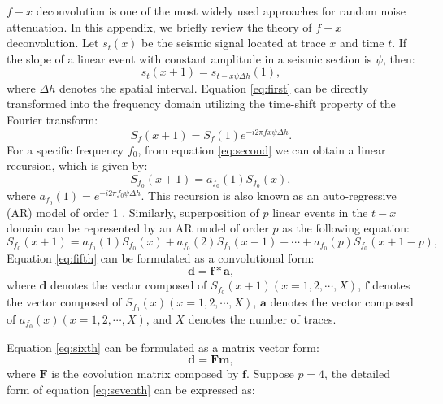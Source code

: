 
$f-x$ deconvolution is one of the most widely used approaches for random noise attenuation. In this appendix, we briefly review the theory of $f-x$ deconvolution. Let $s_t(x)$ be the seismic signal located at trace $x$ and time $t$. If the slope of a linear event with constant amplitude in a seismic section is $\psi$, then:
\begin{equation}
\label{eq:first}
s_t(x+1)=s_{t-x\psi\Delta h}(1),
\end{equation}
where $\Delta h$ denotes the spatial interval. Equation \ref{eq:first} can be directly transformed into the frequency domain utilizing the time-shift property of the Fourier transform:
\begin{equation}
\label{eq:second}
S_f(x+1)=S_f(1)e^{-i2\pi fx\psi\Delta h}.
\end{equation}
For a specific frequency $f_0$,  from equation \ref{eq:second} we can  obtain a linear recursion, which is given by:
\begin{equation}
\label{eq:third}
S_{f_0}(x+1)=a_{f_0}(1)S_{f_0}(x),
\end{equation}
where  $a_{f_0}(1)=e^{-i2\pi f_0\psi\Delta h}$. 
This recursion is also known as an auto-regressive (AR) model of order 1 \cite[]{canales}. Similarly, superposition of $p$ linear events in the $t-x$ domain can be represented by an AR model of order $p$ \cite[]{tufts,har} as the following equation:
\begin{equation}
\label{eq:fifth}
S_{f_0}(x+1)=a_{f_0}(1)S_{f_0}(x)+a_{f_0}(2)S_{f_0}(x-1)+\cdots+a_{f_0}(p)S_{f_0}(x+1-p),
\end{equation}
Equation \ref{eq:fifth} can be formulated as a convolutional form:
\begin{equation}
\label{eq:sixth}
\mathbf{d}=\mathbf{f}*\mathbf{a},
\end{equation}
where $\mathbf{d}$ denotes the vector composed of $S_{f_0}(x+1)(x=1,2,\cdots,X)$, $\mathbf{f}$ denotes the vector composed of $S_{f_0}(x)(x=1,2,\cdots,X)$, $\mathbf{a}$ denotes the vector composed of $a_{f_0}(x)(x=1,2,\cdots,X)$, and $X$ denotes the number of traces.

Equation \ref{eq:sixth} can be formulated as a matrix vector form:
\begin{equation}
\label{eq:seventh}
\mathbf{d}=\mathbf{Fm},
\end{equation}
where $\mathbf{F}$ is the covolution matrix composed by $\mathbf{f}$. Suppose $p=4$, the detailed form of equation \ref{eq:seventh} can be expressed as:

